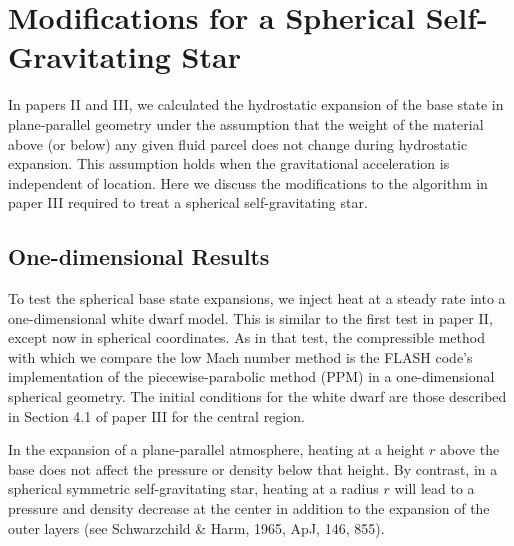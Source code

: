 
\section{\label{sec:sphericalgravity} Modifications for a Spherical Self-Gravitating Star}

In papers II and III, we calculated the hydrostatic expansion of the base state
in plane-parallel geometry under the assumption that the weight of the
material above (or below) any given fluid parcel does not change
during hydrostatic expansion.  This assumption holds when the
gravitational acceleration is independent of location.  Here we discuss the
modifications to the algorithm in paper III required to treat a spherical 
self-gravitating star.

\subsection{One-dimensional Results}

To test the spherical base state expansions, we inject heat at a
steady rate into a one-dimensional white dwarf model.  This is similar
to the first test in paper II, except now in spherical coordinates.
As in that test, the compressible method with which we compare the low Mach number method 
is the FLASH code's implementation of the
piecewise-parabolic method (PPM) in a one-dimensional spherical geometry.  
The initial conditions for the white dwarf are those described in
Section 4.1 of paper III for the central region.


In the expansion of a plane-parallel atmosphere, heating at a
height $r$ above the base does not affect the pressure or density 
below that height.  By contrast, in a spherical symmetric
self-gravitating star, heating at a radius $r$ will lead to a pressure
and density decrease at the center in addition to the expansion of the
outer layers (see Schwarzchild \& Harm, 1965, ApJ, 146, 855).


